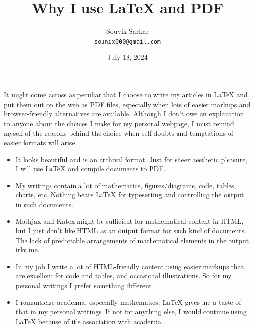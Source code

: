 \documentclass[11pt,a4paper]{article}
\title{\bfseries Why I use \LaTeX{} and PDF}
\author{Souvik Sarkar \\ \texttt{sounix000@gmail.com}} %
\date{July 18, 2024}
\begin{document}
\maketitle %

It might come across as peculiar that I choose to write my articles in \LaTeX{} and put them out on the web as PDF files, especially when lots of easier markups and browser-friendly alternatives are available. Although I don't owe an explanation to anyone about the choices I make for my personal webpage, I must remind myself of the reasons behind the choice when self-doubts and temptations of easier formats will arise.

\begin{itemize}
\item It looks beautiful and is an archival format. Just for sheer aesthetic pleasure, I will use \LaTeX{} and compile documents to PDF.
\item My writings contain a lot of mathematics, figures/diagrams, code, tables, charts, etc. Nothing beats \LaTeX{} for typesetting and controlling the output in such documents.
\item Mathjax and Katex might be sufficient for mathematical content in HTML, but I just don't like HTML as an output format for such kind of documents. The lack of predictable arrangements of mathematical elements in the output irks me.
\item In my job I write a lot of HTML-friendly content using easier markups that are excellent for code and tables, and occasional illustrations. So for my personal writings I prefer something different.
\item I romanticize academia, especially mathematics. \LaTeX{} gives me a taste of that in my personal writings. If not for anything else, I would continue using \LaTeX{} because of it's association with academia.
\end{itemize}
\end{document}
